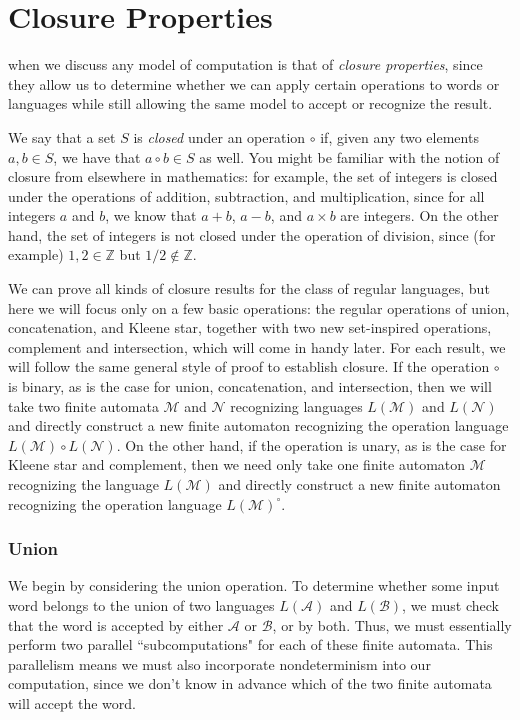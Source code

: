 \section{Closure Properties}\label{sec:closurepropertiesregular}

 when we discuss any model of computation is that of \emph{closure properties}, since they allow us to determine whether we can apply certain operations to words or languages while still allowing the same model to accept or recognize the result.

We say that a set $S$ is \emph{closed} under an operation $\circ$ if, given any two elements $a, b \in S$, we have that $a \circ b \in S$ as well. You might be familiar with the notion of closure from elsewhere in mathematics: for example, the set of integers is closed under the operations of addition, subtraction, and multiplication, since for all integers $a$ and $b$, we know that $a + b$, $a - b$, and $a \times b$ are integers. On the other hand, the set of integers is not closed under the operation of division, since (for example) $1, 2 \in \mathbb{Z}$ but $1/2 \not\in \mathbb{Z}$.

We can prove all kinds of closure results for the class of regular languages, but here we will focus only on a few basic operations: the regular operations of union, concatenation, and Kleene star, together with two new set-inspired operations, complement and intersection, which will come in handy later. For each result, we will follow the same general style of proof to establish closure. If the operation $\circ$ is binary, as is the case for union, concatenation, and intersection, then we will take two finite automata $\mathcal{M}$ and $\mathcal{N}$ recognizing languages $L(\mathcal{M})$ and $L(\mathcal{N})$ and directly construct a new finite automaton recognizing the operation language $L(\mathcal{M}) \circ L(\mathcal{N})$. On the other hand, if the operation is unary, as is the case for Kleene star and complement, then we need only take one finite automaton $\mathcal{M}$ recognizing the language $L(\mathcal{M})$ and directly construct a new finite automaton recognizing the operation language $L(\mathcal{M})^{\circ}$.

\subsubsection*{Union}

We begin by considering the union operation. To determine whether some input word belongs to the union of two languages $L(\mathcal{A})$ and $L(\mathcal{B})$, we must check that the word is accepted by either $\mathcal{A}$ or $\mathcal{B}$, or by both. Thus, we must essentially perform two parallel ``subcomputations" for each of these finite automata. This parallelism means we must also incorporate nondeterminism into our computation, since we don't know in advance which of the two finite automata will accept the word.

